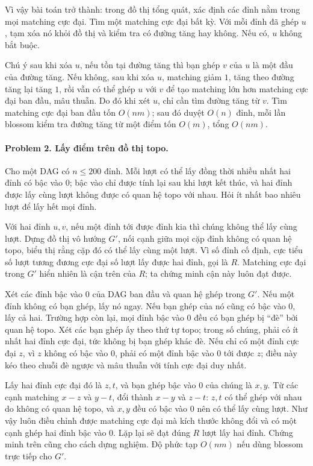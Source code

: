 \documentclass[11pt]{article}
\begin{document}
Vì vậy bài toán trở thành: trong đồ thị tổng quát, xác định các đỉnh nằm trong
mọi matching cực đại. Tìm một matching cực đại bất kỳ. Với mỗi đỉnh đã ghép
\(u\), tạm xóa nó khỏi đồ thị và kiểm tra có đường tăng hay không. Nếu có, \(u\)
không bắt buộc.

Chú ý sau khi xóa \(u\), nếu tồn tại đường tăng thì bạn ghép \(v\) của \(u\) là
một đầu của đường tăng. Nếu không, sau khi xóa \(u\), matching giảm \(1\), tăng
theo đường tăng lại tăng \(1\), rồi vẫn có thể ghép \(u\) với \(v\) để tạo
matching lớn hơn matching cực đại ban đầu, mâu thuẫn. Do đó khi xét \(u\), chỉ
cần tìm đường tăng từ \(v\). Tìm matching cực đại ban đầu tốn \(O(nm)\); sau đó
duyệt \(O(n)\) đỉnh, mỗi lần blossom kiểm tra đường tăng từ một điểm tốn
\(O(m)\), tổng \(O(nm)\).

\paragraph{Problem 2. Lấy điểm trên đồ thị topo.}
Cho một DAG có \(n\le 200\) đỉnh. Mỗi lượt có thể lấy đồng thời nhiều nhất hai
đỉnh có bậc vào \(0\); bậc vào chỉ được tính lại sau khi lượt kết thúc, và hai
đỉnh được lấy cùng lượt không được có quan hệ topo với nhau. Hỏi ít nhất bao
nhiêu lượt để lấy hết mọi đỉnh.

Với hai đỉnh \(u,v\), nếu một đỉnh tới được đỉnh kia thì chúng không thể lấy
cùng lượt. Dựng đồ thị vô hướng \(G'\), nối cạnh giữa mọi cặp đỉnh không có
quan hệ topo, biểu thị rằng cặp đó có thể lấy cùng một lượt. Vì số đỉnh cố
định, cực tiểu số lượt tương đương cực đại số lượt lấy được hai đỉnh, gọi là
\(R\). Matching cực đại trong \(G'\) hiển nhiên là cận trên của \(R\); ta chứng
minh cận này luôn đạt được.

Xét các đỉnh bậc vào \(0\) của DAG ban đầu và quan hệ ghép trong \(G'\). Nếu một
đỉnh không có bạn ghép, lấy nó ngay. Nếu bạn ghép của nó cũng có bậc vào \(0\),
lấy cả hai. Trường hợp còn lại, mọi đỉnh bậc vào \(0\) đều có bạn ghép bị
``đè'' bởi quan hệ topo. Xét các bạn ghép ấy theo thứ tự topo; trong số chúng,
phải có ít nhất hai đỉnh cực đại, tức không bị bạn ghép khác đè. Nếu chỉ có một
đỉnh cực đại \(z\), vì \(z\) không có bậc vào \(0\), phải có một đỉnh bậc vào
\(0\) tới được \(z\); điều này kéo theo chuỗi đè ngược và mâu thuẫn với tính cực
đại duy nhất.

Lấy hai đỉnh cực đại đó là \(z,t\), và bạn ghép bậc vào \(0\) của chúng là
\(x,y\). Từ các cạnh matching \(x-z\) và \(y-t\), đổi thành \(x-y\) và \(z-t\):
\(z,t\) có thể ghép với nhau do không có quan hệ topo, và \(x,y\) đều có bậc
vào \(0\) nên có thể lấy cùng lượt. Như vậy luôn điều chỉnh được matching cực
đại mà kích thước không đổi và có một cạnh ghép hai đỉnh bậc vào \(0\). Lặp lại
sẽ đạt đúng \(R\) lượt lấy hai đỉnh. Chứng minh trên cũng cho cách dựng nghiệm.
Độ phức tạp \(O(nm)\) nếu dùng blossom trực tiếp cho \(G'\).
\end{document}
